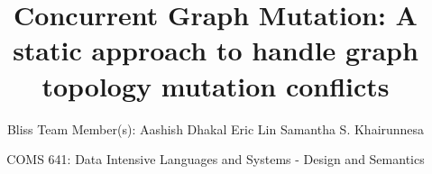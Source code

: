 \documentclass[hyperref={pdfpagelabels=false}]{beamer}
\title[641 Project]{Concurrent Graph Mutation: A static approach to handle graph topology mutation conflicts}
\author[Team Bliss]{Bliss
\linebreak Team Member(s):
\linebreak Aashish Dhakal
\linebreak Eric Lin
\linebreak Samantha S. Khairunnesa}
\institute[ISU]{Department of Computer Science \linebreak Iowa State
University}
\date[COMS 641]{COMS 641: Data Intensive Languages and Systems - Design and Semantics}
\begin{document}
  \begin{frame}[plain]
    \titlepage
  \end{frame}
  
  
  
  
  
  
\end{document}
